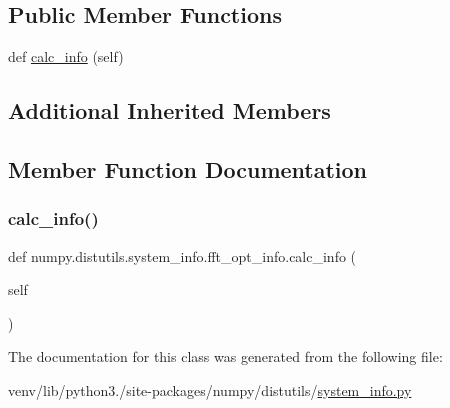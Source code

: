 \subsection*{Public Member Functions}
\begin{DoxyCompactItemize}
\item 
def \hyperlink{classnumpy_1_1distutils_1_1system__info_1_1fft__opt__info_a7559614516bfed28bf4203a63e70e0fc}{calc\+\_\+info} (self)
\end{DoxyCompactItemize}
\subsection*{Additional Inherited Members}


\subsection{Member Function Documentation}
\mbox{\label{classnumpy_1_1distutils_1_1system__info_1_1fft__opt__info_a7559614516bfed28bf4203a63e70e0fc}} 
\subsubsection{\texorpdfstring{calc\+\_\+info()}{calc\_info()}}
{\footnotesize\ttfamily def numpy.\+distutils.\+system\+\_\+info.\+fft\+\_\+opt\+\_\+info.\+calc\+\_\+info (\begin{DoxyParamCaption}\item[{}]{self }\end{DoxyParamCaption})}



The documentation for this class was generated from the following file\+:\begin{DoxyCompactItemize}
\item 
venv/lib/python3./site-\/packages/numpy/distutils/\hyperlink{system__info_8py}{system\+\_\+info.\+py}\end{DoxyCompactItemize}
